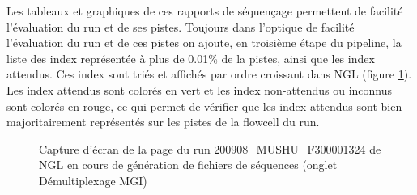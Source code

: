 Les tableaux et graphiques de ces rapports de séquençage permettent de facilité l'évaluation du run et de ses pistes.
Toujours dans l'optique de facilité l'évaluation du run et de ces pistes on ajoute, en troisième étape du pipeline, la liste des index représentée à plus de 0.01\% de la pistes, ainsi que les index attendus.
Ces index sont triés et affichés par ordre croissant dans NGL (figure \ref{top-index}).
Les index attendus sont colorés en vert et les index non-attendus ou inconnus sont colorés en rouge, ce qui permet de vérifier que les index attendus sont bien majoritairement représentés sur les pistes de la flowcell du run.

\begin{figure}[H]
    \centering
    \caption{\footnotesize{Capture d'écran de la page du run 200908\_MUSHU\_F300001324 de NGL en cours de génération de fichiers de séquences (onglet \og Démultiplexage MGI\fg{})}}
    \label{top-index}
\end{figure}

